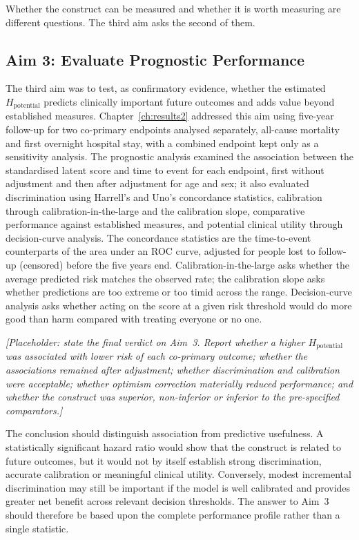 Whether the construct can be measured and whether it is worth measuring are
different questions. The third aim asks the second of them.

\subsection{Aim 3: Evaluate Prognostic Performance}

The third aim was to test, as confirmatory evidence, whether the estimated $H_{\text{potential}}$ predicts clinically important future outcomes and adds value beyond established measures. Chapter~\ref{ch:results2} addressed this aim using five-year follow-up for two co-primary endpoints analysed separately, all-cause mortality and first overnight hospital stay, with a combined endpoint kept only as a sensitivity analysis. The prognostic analysis examined the association between the standardised latent score and time to event for each endpoint, first without adjustment and then after adjustment for age and sex; it also evaluated discrimination using Harrell's and Uno's concordance \citep{uno_2011} statistics, calibration through calibration-in-the-large and the calibration slope, comparative performance against established measures, and potential clinical utility through decision-curve analysis. The concordance statistics are the time-to-event counterparts of the area under an ROC curve, adjusted for people lost to follow-up (censored) before the five years end. Calibration-in-the-large asks whether the average predicted risk matches the observed rate; the calibration slope asks whether predictions are too extreme or too timid across the range. Decision-curve analysis asks whether acting on the score at a given risk threshold would do more good than harm compared with treating everyone or no one.

\medskip
\noindent\emph{[Placeholder: state the final verdict on Aim~3. Report whether a higher $H_{\text{potential}}$ was associated with lower risk of each co-primary outcome; whether the associations remained after adjustment; whether discrimination and calibration were acceptable; whether optimism correction materially reduced performance; and whether the construct was superior, non-inferior or inferior to the pre-specified comparators.]}

The conclusion should distinguish association from predictive usefulness. A statistically significant hazard ratio would show that the construct is related to future outcomes, but it would not by itself establish strong discrimination, accurate calibration or meaningful clinical utility. Conversely, modest incremental discrimination may still be important if the model is well calibrated and provides greater net benefit \citep{vickers_elkin_2006} across relevant decision thresholds. The answer to Aim~3 should therefore be based upon the complete performance profile rather than a single statistic.

